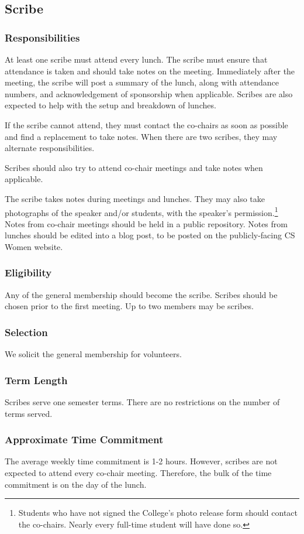 \subsection{Scribe}
\label{sec:scribe}

\subsubsection{Responsibilities}
At least one scribe must attend every lunch. The scribe must ensure that attendance is taken and should take notes on the meeting. Immediately after the meeting, the scribe will post a summary of the lunch, along with attendance numbers, and acknowledgement of sponsorship when applicable. Scribes are also expected to help with the setup and breakdown of lunches. 

If the scribe cannot attend, they must contact the co-chairs as soon as possible and find a replacement to take notes. When there are two scribes, they may alternate responsibilities.

Scribes should also try to attend co-chair meetings and take notes when applicable.


The scribe takes notes during meetings and lunches. They may also take photographs of the speaker and/or students, with the speaker's permission.\footnote{Students who have not signed the College's photo release form should contact the co-chairs. Nearly every full-time student will have done so.} Notes from co-chair meetings should be held in a public repository. Notes from lunches should be edited into a blog post, to be posted on the publicly-facing CS Women website. 

\subsubsection{Eligibility}
Any of the general membership should become the scribe. Scribes should be chosen prior to the first meeting. Up to two members may be scribes.

\subsubsection{Selection}
We solicit the general membership for volunteers.

\subsubsection{Term Length}
Scribes serve one semester terms. There are no restrictions on the number of terms served.

\subsubsection{Approximate Time Commitment}
The average weekly time commitment is 1-2 hours. However, scribes are not expected to attend every co-chair meeting. Therefore, the bulk of the time commitment is on the day of the lunch.